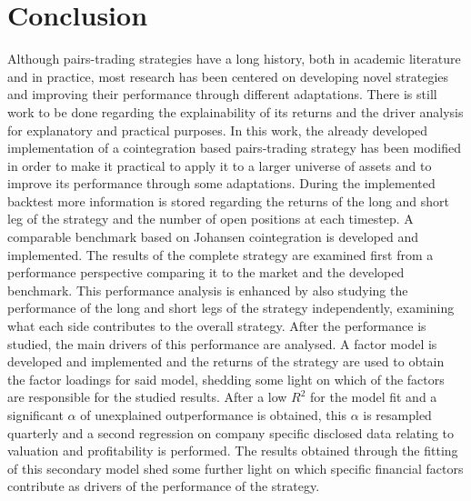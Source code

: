 \section{Conclusion}

Although pairs-trading strategies have a long history, both in academic literature and in practice, most research has been centered on developing novel strategies and improving their performance through different adaptations. There is still work to be done regarding the explainability of its returns and the driver analysis for explanatory and practical purposes. 
In this work, the already developed implementation of a cointegration based pairs-trading strategy has been modified in order to make it practical to apply it to a larger universe of assets and to improve its performance through some adaptations. During the implemented backtest more information is stored regarding the returns of the long and short leg of the strategy and the number of open positions at each timestep. A comparable benchmark based on Johansen cointegration is developed and implemented. The results of the complete strategy are examined first from a performance perspective comparing it to the market and the developed benchmark. This performance analysis is enhanced by also studying the performance of the long and short legs of the strategy independently, examining what each side contributes to the overall strategy. 
After the performance is studied, the main drivers of this performance are analysed. A factor model is developed and implemented and the returns of the strategy are used to obtain the factor loadings for said model, shedding some light on which of the factors are responsible for the studied results. After a low $R^2$ for the model fit and a significant $\alpha$ of unexplained outperformance is obtained, this $\alpha$ is resampled quarterly and a second regression on company specific disclosed data relating to valuation and profitability is performed. The results obtained through the fitting of this secondary model shed some further light on which specific financial factors contribute as drivers of the performance of the strategy. 

